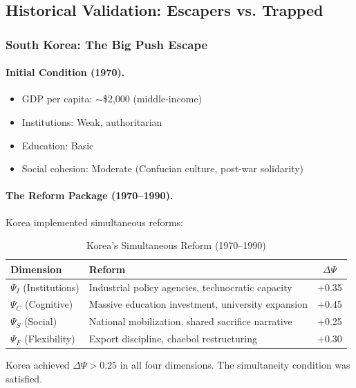 \subsection{Historical Validation: Escapers vs. Trapped}

\subsubsection{South Korea: The Big Push Escape}

\paragraph{Initial Condition (1970).}
\begin{itemize}
    \item GDP per capita: $\sim$\$2,000 (middle-income)
    \item Institutions: Weak, authoritarian
    \item Education: Basic
    \item Social cohesion: Moderate (Confucian culture, post-war solidarity)
\end{itemize}

\paragraph{The Reform Package (1970--1990).}
Korea implemented simultaneous reforms:

\begin{table}[htbp]
\centering
\caption{Korea's Simultaneous Reform (1970--1990)}
\label{tab:korea-reforms}
\begin{tabular}{@{}llc@{}}
\toprule
\textbf{Dimension} & \textbf{Reform} & \textbf{$\Delta \Psi$} \\
\midrule
$\Psi_I$ (Institutions) & Industrial policy agencies, technocratic capacity & +0.35 \\
$\Psi_C$ (Cognitive) & Massive education investment, university expansion & +0.45 \\
$\Psi_S$ (Social) & National mobilization, shared sacrifice narrative & +0.25 \\
$\Psi_F$ (Flexibility) & Export discipline, chaebol restructuring & +0.30 \\
\bottomrule
\end{tabular}
\end{table}

Korea achieved $\Delta \Psi > 0.25$ in all four dimensions. The simultaneity 
condition was satisfied.

